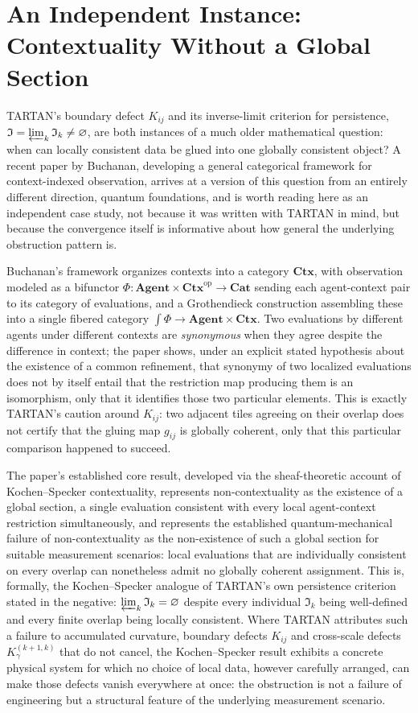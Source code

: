 \section{An Independent Instance: Contextuality Without a Global Section}

TARTAN's boundary defect $K_{ij}$ and its inverse-limit criterion for persistence, $\mathfrak{I} = \varprojlim_k \mathfrak{I}_k \neq \varnothing$, are both instances of a much older mathematical question: when can locally consistent data be glued into one globally consistent object? A recent paper by Buchanan, developing a general categorical framework for context-indexed observation, arrives at a version of this question from an entirely different direction, quantum foundations, and is worth reading here as an independent case study, not because it was written with TARTAN in mind, but because the convergence itself is informative about how general the underlying obstruction pattern is.

Buchanan's framework organizes contexts into a category $\mathbf{Ctx}$, with observation modeled as a bifunctor $\Phi : \mathbf{Agent} \times \mathbf{Ctx}^{\mathrm{op}} \to \mathbf{Cat}$ sending each agent-context pair to its category of evaluations, and a Grothendieck construction assembling these into a single fibered category $\int \Phi \to \mathbf{Agent} \times \mathbf{Ctx}$. Two evaluations by different agents under different contexts are \emph{synonymous} when they agree despite the difference in context; the paper shows, under an explicit stated hypothesis about the existence of a common refinement, that synonymy of two localized evaluations does not by itself entail that the restriction map producing them is an isomorphism, only that it identifies those two particular elements. This is exactly TARTAN's caution around $K_{ij}$: two adjacent tiles agreeing on their overlap does not certify that the gluing map $g_{ij}$ is globally coherent, only that this particular comparison happened to succeed.

The paper's established core result, developed via the sheaf-theoretic account of Kochen--Specker contextuality, represents non-contextuality as the existence of a global section, a single evaluation consistent with every local agent-context restriction simultaneously, and represents the established quantum-mechanical failure of non-contextuality as the non-existence of such a global section for suitable measurement scenarios: local evaluations that are individually consistent on every overlap can nonetheless admit no globally coherent assignment. This is, formally, the Kochen--Specker analogue of TARTAN's own persistence criterion stated in the negative: $\varprojlim_k \mathfrak{I}_k = \varnothing$ despite every individual $\mathfrak{I}_k$ being well-defined and every finite overlap being locally consistent. Where TARTAN attributes such a failure to accumulated curvature, boundary defects $K_{ij}$ and cross-scale defects $K_\gamma^{(k+1,k)}$ that do not cancel, the Kochen--Specker result exhibits a concrete physical system for which no choice of local data, however carefully arranged, can make those defects vanish everywhere at once: the obstruction is not a failure of engineering but a structural feature of the underlying measurement scenario.

